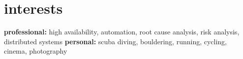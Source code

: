 \documentclass[]{friggeri-cv} %
\begin{document}







\section{interests}

\textbf{professional:} high availability, automation, root cause analysis, risk analysis, distributed systems \textbf{personal:} scuba diving, bouldering, running, cycling, cinema, photography
\end{document}
